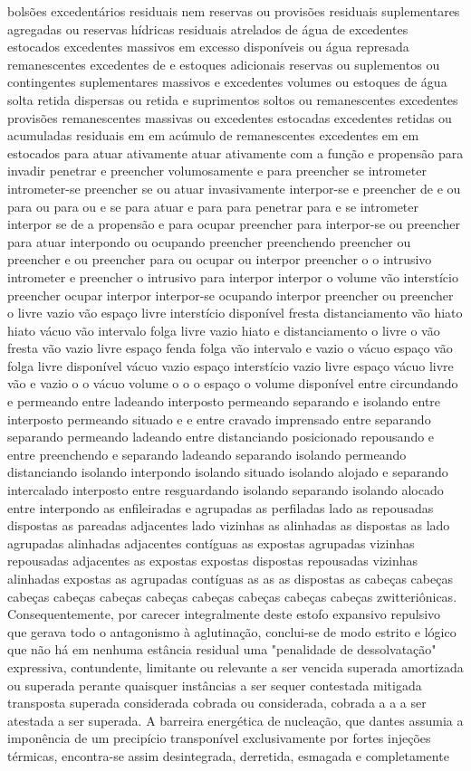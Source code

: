 bolsões excedentários residuais nem reservas ou provisões residuais suplementares agregadas ou reservas hídricas residuais atrelados de água de excedentes estocados excedentes massivos em excesso disponíveis ou água represada remanescentes excedentes de e estoques adicionais reservas ou suplementos ou contingentes suplementares massivos e excedentes volumes ou estoques de água solta retida dispersas ou retida e suprimentos soltos ou remanescentes excedentes provisões remanescentes massivas ou excedentes estocadas excedentes retidas ou acumuladas residuais em em acúmulo de remanescentes excedentes em em estocados para atuar ativamente atuar ativamente com a função e propensão para invadir penetrar e preencher volumosamente e para preencher se intrometer intrometer-se preencher se ou atuar invasivamente interpor-se e preencher de e ou para ou para ou e se para atuar e para para penetrar para e se intrometer interpor se de a propensão e para ocupar preencher para interpor-se ou preencher para atuar interpondo ou ocupando preencher preenchendo preencher ou preencher e ou preencher para ou ocupar ou interpor preencher o o intrusivo intrometer e preencher o intrusivo para interpor interpor o volume vão interstício preencher ocupar interpor interpor-se ocupando interpor preencher ou preencher o livre vazio vão espaço livre interstício disponível fresta distanciamento vão hiato hiato vácuo vão intervalo folga livre vazio hiato e distanciamento o livre o vão fresta vão vazio livre espaço fenda folga vão intervalo e vazio o vácuo espaço vão folga livre disponível vácuo vazio espaço interstício vazio livre espaço vácuo livre vão e vazio o o vácuo volume o o o espaço o volume disponível entre circundando e permeando entre ladeando interposto permeando separando e isolando entre interposto permeando situado e e entre cravado imprensado entre separando separando permeando ladeando entre distanciando posicionado repousando e entre preenchendo e separando ladeando separando isolando permeando distanciando isolando interpondo isolando situado isolando alojado e separando intercalado interposto entre resguardando isolando separando isolando alocado entre interpondo as enfileiradas e agrupadas as perfiladas lado as repousadas dispostas as pareadas adjacentes lado vizinhas as alinhadas as dispostas as lado agrupadas alinhadas adjacentes contíguas as expostas agrupadas vizinhas repousadas adjacentes as expostas expostas dispostas repousadas vizinhas alinhadas expostas as agrupadas contíguas as as as dispostas as cabeças cabeças cabeças cabeças cabeças cabeças cabeças cabeças cabeças cabeças zwitteriônicas. Consequentemente, por carecer integralmente deste estofo expansivo repulsivo que gerava todo o antagonismo à aglutinação, conclui-se de modo estrito e lógico que não há em nenhuma estância residual uma "penalidade de dessolvatação" expressiva, contundente, limitante ou relevante a ser vencida superada amortizada ou superada perante quaisquer instâncias a ser sequer contestada mitigada transposta superada considerada cobrada ou considerada, cobrada a a a ser atestada a ser superada. A barreira energética de nucleação, que dantes assumia a imponência de um precipício transponível exclusivamente por fortes injeções térmicas, encontra-se assim desintegrada, derretida, esmagada e completamente 